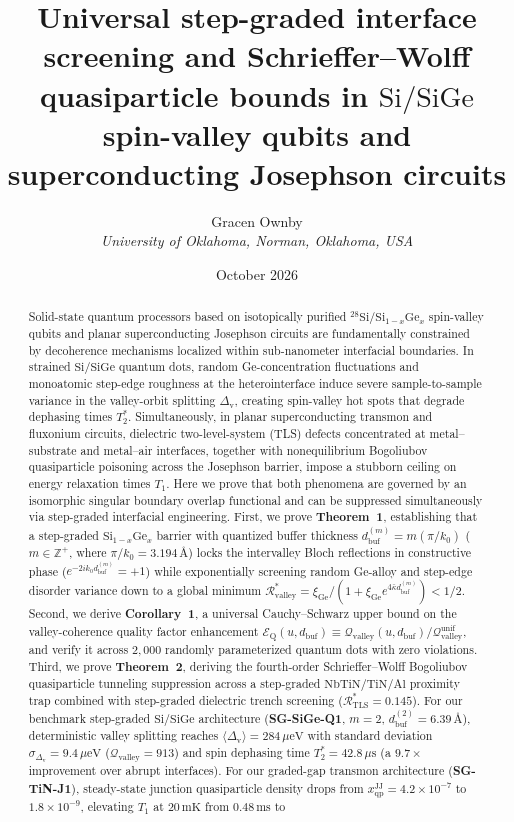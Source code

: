 \documentclass[11pt,letterpaper]{article}
\title{\textbf{Universal step-graded interface screening and Schrieffer--Wolff quasiparticle bounds in $\mathrm{Si/SiGe}$ spin-valley qubits and superconducting Josephson circuits}}
\author{Gracen Ownby\\
\textit{University of Oklahoma, Norman, Oklahoma, USA}}
\date{October 2026}
\theoremstyle{definition}
\begin{document}
\maketitle

\begin{abstract}
Solid-state quantum processors based on isotopically purified ${}^{28}\mathrm{Si}/\mathrm{Si}_{1-x}\mathrm{Ge}_x$ spin-valley qubits and planar superconducting Josephson circuits are fundamentally constrained by decoherence mechanisms localized within sub-nanometer interfacial boundaries. In strained $\mathrm{Si/SiGe}$ quantum dots, random Ge-concentration fluctuations and monoatomic step-edge roughness at the heterointerface induce severe sample-to-sample variance in the valley-orbit splitting $\Delta_{\mathrm{v}}$, creating spin-valley hot spots that degrade dephasing times $T_2^*$. Simultaneously, in planar superconducting transmon and fluxonium circuits, dielectric two-level-system (TLS) defects concentrated at metal--substrate and metal--air interfaces, together with nonequilibrium Bogoliubov quasiparticle poisoning across the Josephson barrier, impose a stubborn ceiling on energy relaxation times $T_1$. Here we prove that both phenomena are governed by an isomorphic singular boundary overlap functional and can be suppressed simultaneously via step-graded interfacial engineering. First, we prove \textbf{Theorem~1}, establishing that a step-graded $\mathrm{Si}_{1-x}\mathrm{Ge}_x$ barrier with quantized buffer thickness $d_{\mathrm{buf}}^{(m)} = m(\pi/k_0)$ ($m \in \mathbb{Z}^+$, where $\pi/k_0 = 3.194\,\text{\AA}$) locks the intervalley Bloch reflections in constructive phase ($e^{-2i k_0 d_{\mathrm{buf}}^{(m)}} = +1$) while exponentially screening random Ge-alloy and step-edge disorder variance down to a global minimum $\mathcal{R}_{\mathrm{valley}}^* = \xi_{\mathrm{Ge}}/(1 + \xi_{\mathrm{Ge}}e^{4\bar{\kappa} d_{\mathrm{buf}}^{(m)}}) < 1/2$. Second, we derive \textbf{Corollary~1}, a universal Cauchy--Schwarz upper bound on the valley-coherence quality factor enhancement $\mathcal{E}_{\mathrm{Q}}(u, d_{\mathrm{buf}}) \equiv \mathcal{Q}_{\mathrm{valley}}(u, d_{\mathrm{buf}})/\mathcal{Q}_{\mathrm{valley}}^{\mathrm{unif}}$, and verify it across $2{,}000$ randomly parameterized quantum dots with zero violations. Third, we prove \textbf{Theorem~2}, deriving the fourth-order Schrieffer--Wolff Bogoliubov quasiparticle tunneling suppression across a step-graded $\mathrm{NbTiN/TiN/Al}$ proximity trap combined with step-graded dielectric trench screening ($\mathcal{R}_{\mathrm{TLS}}^* = 0.145$). For our benchmark step-graded $\mathrm{Si/SiGe}$ architecture (\textbf{SG-SiGe-Q1}, $m=2$, $d_{\mathrm{buf}}^{(2)} = 6.39\,\text{\AA}$), deterministic valley splitting reaches $\langle\Delta_{\mathrm{v}}\rangle = 284\,\mu\mathrm{eV}$ with standard deviation $\sigma_{\Delta_{\mathrm{v}}} = 9.4\,\mu\mathrm{eV}$ ($\mathcal{Q}_{\mathrm{valley}} = 913$) and spin dephasing time $T_2^* = 42.8\,\mu\mathrm{s}$ (a $9.7\times$ improvement over abrupt interfaces). For our graded-gap transmon architecture (\textbf{SG-TiN-J1}), steady-state junction quasiparticle density drops from $x_{\mathrm{qp}}^{\mathrm{JJ}} = 4.2\times 10^{-7}$ to $1.8\times 10^{-9}$, elevating $T_1$ at $20\,\mathrm{mK}$ from $0.48\,\mathrm{ms}$ to 
\end{abstract}
\end{document}
